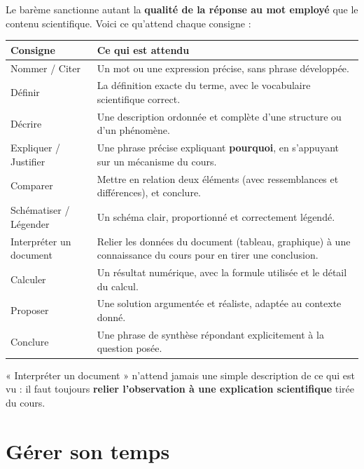 \begin{propriete}
Le barème sanctionne autant la \textbf{qualité de la réponse au mot employé} que le
contenu scientifique. Voici ce qu'attend chaque consigne :
\end{propriete}

\begin{center}
\small
\begin{tabular}{@{}p{3.1cm}p{9.2cm}@{}}
\toprule
\textbf{Consigne} & \textbf{Ce qui est attendu} \\
\midrule
Nommer / Citer & Un mot ou une expression précise, sans phrase développée. \\
Définir & La définition exacte du terme, avec le vocabulaire scientifique correct. \\
Décrire & Une description ordonnée et complète d'une structure ou d'un
phénomène. \\
Expliquer / Justifier & Une phrase précise expliquant \textbf{pourquoi}, en
s'appuyant sur un mécanisme du cours. \\
Comparer & Mettre en relation deux éléments (avec ressemblances et différences),
et conclure. \\
Schématiser / Légender & Un schéma clair, proportionné et correctement légendé. \\
Interpréter un document & Relier les données du document (tableau, graphique) à une
connaissance du cours pour en tirer une conclusion. \\
Calculer & Un résultat numérique, avec la formule utilisée et le détail du
calcul. \\
Proposer & Une solution argumentée et réaliste, adaptée au contexte donné. \\
Conclure & Une phrase de synthèse répondant explicitement à la question posée. \\
\bottomrule
\end{tabular}
\end{center}

\begin{remarque}
« Interpréter un document » n'attend jamais une simple description de ce qui est vu :
il faut toujours \textbf{relier l'observation à une explication scientifique} tirée du
cours.
\end{remarque}

\section{Gérer son temps}

